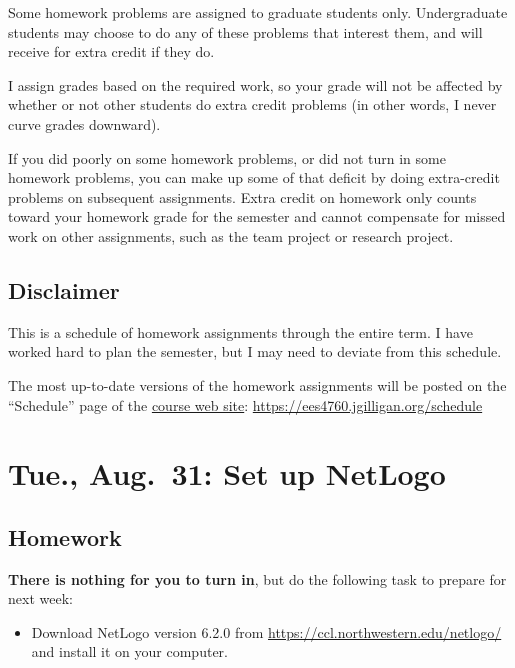 \documentclass[
]{article}
\providecommand{\tightlist}{%
  \setlength{\itemsep}{0pt}\setlength{\parskip}{0pt}}
\begin{document}
Some homework problems are assigned to graduate students only.
Undergraduate students may choose to do any of these problems that
interest them, and will receive for extra credit if they do.

I assign grades based on the required work, so your grade will not be
affected by whether or not other students do extra credit problems (in
other words, I never curve grades downward).

If you did poorly on some homework problems, or did not turn in some
homework problems, you can make up some of that deficit by doing
extra-credit problems on subsequent assignments. Extra credit on
homework only counts toward your homework grade for the semester and
cannot compensate for missed work on other assignments, such as the team
project or research project.

\hypertarget{disclaimer}{%
\subsection{Disclaimer}\label{disclaimer}}

This is a schedule of homework assignments through the entire term. I
have worked hard to plan the semester, but I may need to deviate from
this schedule.

The most up-to-date versions of the homework assignments will be posted
on the ``Schedule'' page of the
\href{https://ees4760.jgilligan.org/schedule}{course web site}:
\url{https://ees4760.jgilligan.org/schedule}

\hypertarget{tue.-aug.-31-set-up-netlogo}{%
\section{Tue., Aug.~31: Set up
NetLogo}\label{tue.-aug.-31-set-up-netlogo}}

\hypertarget{homework}{%
\subsection{Homework}\label{homework}}

\textbf{There is nothing for you to turn in}, but do the following task
to prepare for next week:

\begin{itemize}
\tightlist
\item
  Download NetLogo version 6.2.0 from
  \url{https://ccl.northwestern.edu/netlogo/} and install it on your
  computer.
\end{itemize}
\end{document}
